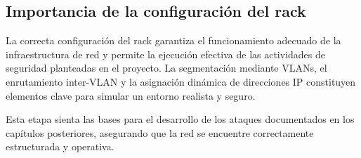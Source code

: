 \subsection{Importancia de la configuración del rack}

La correcta configuración del rack garantiza el funcionamiento adecuado de la infraestructura de red y permite la ejecución efectiva de las actividades de seguridad planteadas en el proyecto. La segmentación mediante VLANs, el enrutamiento inter-VLAN y la asignación dinámica de direcciones IP constituyen elementos clave para simular un entorno realista y seguro.

Esta etapa sienta las bases para el desarrollo de los ataques documentados en los capítulos posteriores, asegurando que la red se encuentre correctamente estructurada y operativa.

